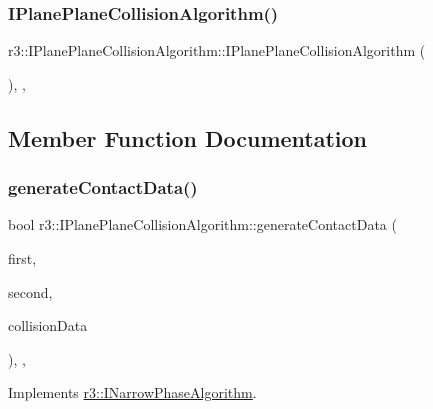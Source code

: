\subsubsection{\texorpdfstring{I\+Plane\+Plane\+Collision\+Algorithm()}{IPlanePlaneCollisionAlgorithm()}}
{\footnotesize\ttfamily r3\+::\+I\+Plane\+Plane\+Collision\+Algorithm\+::\+I\+Plane\+Plane\+Collision\+Algorithm (\begin{DoxyParamCaption}{ }\end{DoxyParamCaption})\hspace{0.3cm}{\ttfamily [explicit]}, {\ttfamily [protected]}, {\ttfamily [default]}}



\subsection{Member Function Documentation}
\mbox{\label{classr3_1_1_i_plane_plane_collision_algorithm_a910587be6f6537f86bbcc5e3a9b40223}} 
\subsubsection{\texorpdfstring{generate\+Contact\+Data()}{generateContactData()}}
{\footnotesize\ttfamily bool r3\+::\+I\+Plane\+Plane\+Collision\+Algorithm\+::generate\+Contact\+Data (\begin{DoxyParamCaption}\item[{\mbox{\hyperlink{classr3_1_1_rigid_body}{Rigid\+Body}} $\ast$}]{first,  }\item[{\mbox{\hyperlink{classr3_1_1_rigid_body}{Rigid\+Body}} $\ast$}]{second,  }\item[{\mbox{\hyperlink{classr3_1_1_collision_data}{Collision\+Data}} \&}]{collision\+Data }\end{DoxyParamCaption})\hspace{0.3cm}{\ttfamily [final]}, {\ttfamily [override]}, {\ttfamily [virtual]}}



Implements \mbox{\hyperlink{classr3_1_1_i_narrow_phase_algorithm_a606fe8de5fe81ff45fedb81ca74717c3}{r3\+::\+I\+Narrow\+Phase\+Algorithm}}.

